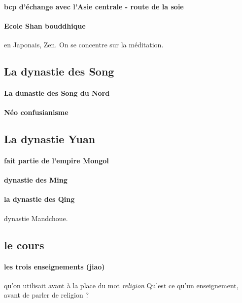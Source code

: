 \paragraph{bcp d'échange avec l'Asie centrale - route de la soie}

\paragraph{Ecole Shan bouddhique} en Japonais, Zen. On se concentre sur la méditation.


\subsection{La dynastie des Song}

\paragraph{La dunastie des Song du Nord}

\paragraph{Néo confusianisme}

\subsection{La dynastie Yuan}

\paragraph{fait partie de l'empire Mongol}


\paragraph{dynastie des Ming}

\paragraph{la dynastie des Qing} dynastie Mandchoue. 


\subsection{le cours}

\paragraph{les trois enseignements (jiao)} qu'on utilisait avant à la place du mot \textit{religion}
Qu'est ce qu'un enseignement, avant de parler de religion ?




